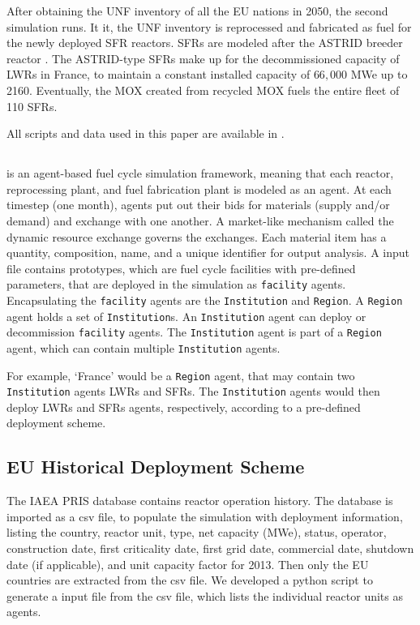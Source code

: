 After obtaining the \gls{UNF} inventory of all the \gls{EU} nations in 2050, the second
simulation runs. It it, the \gls{UNF} inventory is reprocessed and fabricated
as fuel for the newly deployed \gls{SFR} reactors.
\glspl{SFR} are modeled after the ASTRID breeder reactor \cite{varaine_pre-conceptual_2012}.
The ASTRID-type \glspl{SFR} make up for the decommissioned capacity
of \glspl{LWR} in France, to maintain a constant installed capacity of $66,000$ MWe up to 2160.
Eventually, the  \gls{MOX} created from recycled \gls{MOX}
fuels the entire fleet of 110 \glspl{SFR}.

All scripts and data used
in this paper are available in \cite{bae_arfc/transition-scenarios:_2017}.


\subsection{\Cyclus}
\Cyclus is an agent-based fuel cycle simulation framework, meaning that
each reactor, reprocessing plant, and fuel fabrication plant is modeled as an agent.
At each timestep (one month),
agents put out their bids for materials (supply and/or demand) and exchange
with one another. A market-like mechanism called the dynamic resource exchange
\cite{gidden_agent-based_2015} governs the exchanges.
Each material item has a quantity, composition, name, and a unique identifier
for output analysis. 
A \Cyclus input file contains prototypes, which are fuel cycle facilities with
pre-defined parameters, that are deployed in the simulation as \texttt{facility} agents.
Encapsulating the \texttt{facility} agents are the \texttt{Institution} and \texttt{Region}.
A \texttt{Region} agent holds a set of \texttt{Institution}s. 
An \texttt{Institution} agent can deploy or decommission \texttt{facility} agents.
The \texttt{Institution} agent is part of a \texttt{Region} agent,
which can contain multiple \texttt{Institution} agents.


For example, `France' would be a \texttt{Region} agent,
that may contain two \texttt{Institution} agents \glspl{LWR}
and \glspl{SFR}. The \texttt{Institution} agents would then deploy
\glspl{LWR} and \glspl{SFR} agents, respectively, according to a pre-defined deployment
scheme.


\subsection{\gls{EU} Historical Deployment Scheme}

The \gls{IAEA} \gls{PRIS} database \cite{iaea_nuclear_2017} contains reactor
operation history.
The database is imported as a csv file, to populate the simulation
with deployment information, listing the country, reactor unit, type, net capacity (MWe), status,
operator, construction date, first criticality date, first grid date, commercial date, shutdown
date (if applicable), and unit capacity factor for 2013. Then only the \gls{EU} countries are extracted
from the csv file. We developed a python script to generate a \Cyclus input file from the csv file,
which lists the individual reactor units as agents. 

